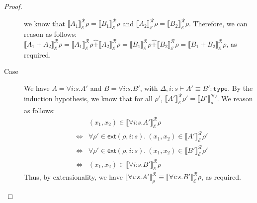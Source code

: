\documentclass[natbib,preprint]{sigplanconf}
\newcommand{\relSum}{\mathrel{\widehat+}}
\newcommand{\sortType}{\texttt{type}}
\newcommand{\relEnv}[1]{\mathcal{#1}}
\newcommand{\rsem}[3]{\llbracket #1 \rrbracket^{\mathcal{R}}_{#2}{#3}}
\newcommand{\extends}[2]{\mathsf{ext}(#1,#2)}
\begin{document}
\begin{proof}
\begin{description}
    we know that $\rsem{A_1}{\relEnv{E}}\rho =
    \rsem{B_1}{\relEnv{E}}\rho$ and $\rsem{A_2}{\relEnv{E}}\rho =
    \rsem{B_2}{\relEnv{E}}\rho$. Therefore, we can reason as follows:
    $\rsem{A_1 + A_2}{\relEnv{E}}\rho = \rsem{A_1}{\relEnv{E}}\rho
    \relSum \rsem{A_2}{\relEnv{E}}\rho = \rsem{B_1}{\relEnv{E}}\rho
    \relSum \rsem{B_2}{\relEnv{E}}\rho = \rsem{B_1 +
      B_2}{\relEnv{E}}\rho$, as required.
  \item[Case \TirName{TyEqForall}] We have $A = \forall
    i\mathord:s. A'$ and $B = \forall i\mathord:s.B'$, with $\Delta, i
    : s \vdash A' \equiv B' : \sortType$. By the induction hypothesis,
    we know that for all $\rho'$, $\rsem{A'}{\relEnv{E}}\rho' =
    \rsem{B'}\rho'$. We reason as follows:
    \begin{eqnarray*}
      &    & (x_1,x_2) \in \rsem{\forall i\mathord:s. A'}{\relEnv{E}}\rho \\
      &\iff& \forall \rho' \in \extends{\rho}{i:s}.\ (x_1,x_2) \in \rsem{A'}{\relEnv{E}}\rho' \\
      &\iff& \forall \rho' \in \extends{\rho}{i:s}.\ (x_1,x_2) \in \rsem{B'}{\relEnv{E}}\rho' \\
      &\iff& (x_1,x_2) \in \rsem{\forall i\mathord:s. B'}{\relEnv{E}}\rho
    \end{eqnarray*}
    Thus, by extensionality, we have $\rsem{\forall
      i\mathord:s.A'}\rho \equiv \rsem{\forall
      i\mathord:s.B'}{\relEnv{E}}\rho$, as required.
  \end{description}
\end{proof}
\end{document}
